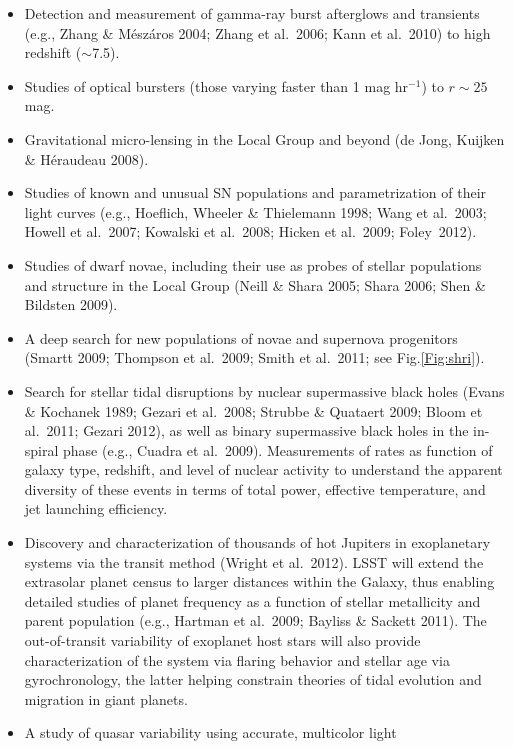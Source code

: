 \documentclass{emulateapj}
\begin{document}
\begin{itemize}
\item Detection and measurement of gamma-ray burst afterglows and transients 
      (e.g., Zhang \& M\'{e}sz\'{a}ros 2004; Zhang et al.~2006; Kann et al.~2010) to high redshift ($\sim$7.5).
  \item Studies of optical bursters (those varying faster than 1 mag hr$^{-1}$) to $r\sim25$ mag. 
\item Gravitational micro-lensing in the Local Group and beyond (de Jong, Kuijken \& H\'{e}raudeau 2008).
\item Studies of known and unusual SN populations and parametrization of their light curves 
         (e.g., Hoeflich, Wheeler \& Thielemann 1998; Wang et al.~2003; Howell et al.~2007;
          Kowalski et al.~2008; Hicken et al.~2009; Foley~2012).
\item Studies of dwarf novae, including their use as probes of stellar populations and 
      structure in the Local Group (Neill \& Shara 2005; Shara 2006; Shen \& Bildsten 2009).
\item A deep search for new populations of novae and supernova progenitors 
      (Smartt 2009; Thompson et al.~2009; Smith et al.~2011; see Fig.\ref{Fig:shri}). 
\item Search for stellar tidal disruptions by nuclear supermassive black
       holes (Evans \& Kochanek 1989; Gezari et al.~2008; Strubbe \& Quataert 2009; Bloom et al.~2011; Gezari 2012), 
       as well as binary supermassive black holes in the in-spiral phase (e.g., Cuadra et al.~2009).
       Measurements of rates as function of galaxy type, redshift, and level of nuclear activity
       to understand the apparent diversity of these events in terms of  total power, effective temperature, 
       and jet launching efficiency. 
\item Discovery and characterization of thousands of hot Jupiters 
  in exoplanetary systems via the transit method (Wright et al.~2012). 
LSST will extend the extrasolar planet census to larger distances within the Galaxy, thus enabling detailed studies 
of planet frequency as a function of stellar metallicity and parent population (e.g., Hartman et al.~2009; Bayliss \& 
Sackett 2011). The out-of-transit variability of exoplanet host stars will also provide characterization of the system 
via flaring behavior and stellar age via gyrochronology, the latter helping constrain theories of tidal evolution and 
migration in giant planets. 
\item A study of quasar variability using accurate, multicolor light

\end{itemize}
\end{document}
